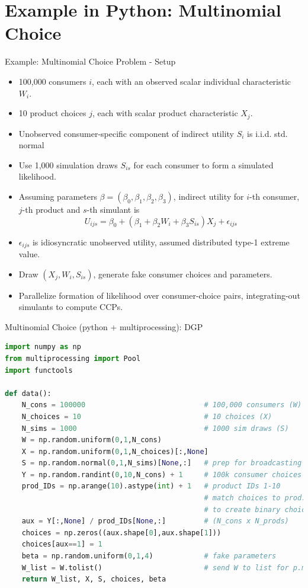 \documentclass[aspectratio=1610,handout]{beamer}
\begin{document}
\section{Example in Python: Multinomial Choice}
\begin{frame}{Example: Multinomial Choice Problem - Setup}
    \begin{itemize}
        \item 100,000 consumers $i$, each with an observed scalar individual characteristic $W_i$.
        \item 10 product choices $j$, each with scalar product characteristic $X_j$.
        \item Unobserved consumer-specific component of indirect utility $S_i$ is i.i.d. std. normal
        \item Use 1,000 simulation draws $S_{is}$ for each consumer to form a simulated likelihood.
        \item Assuming parameters $\beta = (\beta_0,\beta_1,\beta_2,\beta_3)$, indirect utility for $i$-th consumer, $j$-th product and $s$-th simulant is
        \[
        U_{ijs} = \beta_0 + (\beta_1 + \beta_2 W_i + \beta_3 S_{is})X_j + \epsilon_{ijs}
        \]
        \item $\epsilon_{ijs}$ is idiosyncratic unobserved utility, assumed distributed type-1 extreme value.
        \item Draw $(X_j,W_i,S_{is})$, generate fake consumer choices and parameters.
        \item Parallelize formation of likelihood over consumer-choice pairs, integrating-out simulants to compute CCPs.
    \end{itemize}
\end{frame}

\begin{frame}[fragile]{Multinomial Choice (python + multiprocessing): DGP}
    \begin{lstlisting}[language=Python]
import numpy as np
from multiprocessing import Pool
import functools

def data():
    N_cons = 100000                            # 100,000 consumers (W)
    N_choices = 10                             # 10 choices (X)
    N_sims = 1000                              # 1000 sim draws (S)
    W = np.random.uniform(0,1,N_cons)
    X = np.random.uniform(0,1,N_choices)[:,None]
    S = np.random.normal(0,1,N_sims)[None,:]   # prep for broadcasting
    Y = np.random.randint(0,10,N_cons) + 1     # 100k consumer choices (Y) 
    prod_IDs = np.arange(10).astype(int) + 1   # product IDs 1-10
                                               # match choices to prod. IDs
                                               # to create binary choice matrix
    aux = Y[:,None] / prod_IDs[None,:]         # (N_cons x N_prods)
    choices = np.zeros((aux.shape[0],aux.shape[1]))
    choices[aux==1] = 1
    beta = np.random.uniform(0,1,4)            # fake parameters
    W_list = W.tolist()                        # send W to list for p.map
    return W_list, X, S, choices, beta
    \end{lstlisting}
\end{frame}
\end{document}
